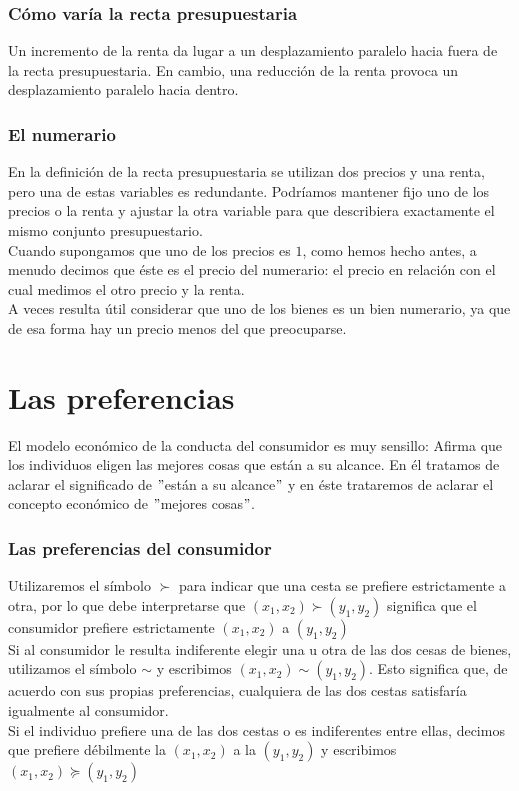 \documentclass[10pt]{article}
\begin{document}
\section*{Cómo varía la recta presupuestaria}
Un incremento de la renta da lugar a un desplazamiento paralelo hacia fuera de la recta presupuestaria. En cambio, una reducción de la renta provoca un desplazamiento paralelo hacia dentro.\\

\section*{El numerario}
En la definición de la recta presupuestaria se utilizan dos precios y una renta, pero una de estas variables es redundante. Podríamos mantener fijo uno de los precios o la renta y ajustar la otra variable para que describiera exactamente el mismo conjunto presupuestario.\\
Cuando supongamos que uno de los precios es $1$, como hemos hecho antes, a menudo decimos que éste es el precio del numerario: el precio en relación con el cual medimos el otro precio y la renta.\\
A veces resulta útil considerar que uno de los bienes es un bien numerario, ya que de esa forma hay un precio menos del que preocuparse.

\part*{\center Las preferencias}
El modelo económico de la conducta del consumidor es muy sensillo: Afirma que los individuos eligen las mejores cosas que están a su alcance. En él tratamos de aclarar el significado de $"$están a su alcance$"$ y en éste trataremos de aclarar el concepto económico de $"$mejores cosas$"$.\\

\section*{Las preferencias del consumidor}
Utilizaremos el símbolo $\succ$ para indicar que una cesta se prefiere estrictamente a otra, por lo que debe interpretarse que $(x_1,x_2)\succ (y_1,y_2)$ significa que el consumidor prefiere estrictamente $(x_1,x_2)$ a $(y_1, y_2)$\\
Si al consumidor le resulta indiferente elegir una u otra de las dos cesas de bienes, utilizamos el símbolo $\sim$ y escribimos $(x_1,x_2) \sim (y_1,y_2)$. Esto significa que, de acuerdo con sus propias preferencias, cualquiera de las dos cestas satisfaría igualmente al consumidor.\\
Si el individuo prefiere una de las dos cestas o es indiferentes entre ellas, decimos que prefiere débilmente la $(x_1,x_2)$ a la $(y_1,y_2)$ y escribimos $(x_1,x_2)\succeq (y_1,y_2)$\\
\end{document}
